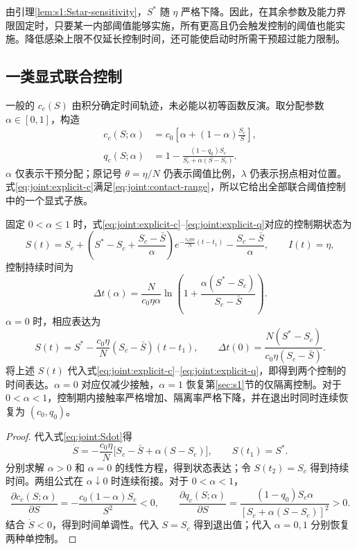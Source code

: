 \documentclass[lang=cn,a4paper,newtx]{elegantpaper}
\numberwithin{equation}{section}
\theoremstyle{plain}
\begin{document}
由引理\ref{lem:s1:Sstar-sensitivity}，$S^*$ 随 $\eta$ 严格下降。因此，在其余参数及能力界限固定时，只要某一内部阈值能够实施，所有更高且仍会触发控制的阈值也能实施。降低感染上限不仅延长控制时间，还可能使启动时所需干预超过能力限制。

\subsection{一类显式联合控制}
一般的 $c_c(S)$ 由积分确定时间轨迹，未必能以初等函数反演。取分配参数 $\alpha\in[0,1]$，构造
\begin{align}
c_c(S;\alpha)&=c_0\left[\alpha+(1-\alpha)\frac{S_c}{S}\right],\label{eq:joint:explicit-c}\\
q_c(S;\alpha)&=1-\frac{(1-q_0)S_c}{S_c+\alpha(S-S_c)}.
\label{eq:joint:explicit-q}
\end{align}
$\alpha$ 仅表示干预分配；原记号 $\theta=\eta/N$ 仍表示阈值比例，$\lambda$ 仍表示拐点相对位置。式\eqref{eq:joint:explicit-c}满足\eqref{eq:joint:contact-range}，所以它给出全部联合阈值控制中的一个显式子族。
\begin{theorem}
\label{thm:joint:explicit}
固定 $0<\alpha\le1$ 时，式\eqref{eq:joint:explicit-c}--\eqref{eq:joint:explicit-q}对应的控制期状态为
\begin{equation}
S(t)=S_c+
\left(S^*-S_c+\frac{S_c-\bar S}{\alpha}\right)
 e^{-\frac{c_0\eta\alpha}{N}(t-t_1)}
-\frac{S_c-\bar S}{\alpha},\qquad I(t)=\eta,
\label{eq:joint:explicit-S}
\end{equation}
控制持续时间为
\begin{equation}
\Delta t(\alpha)=\frac{N}{c_0\eta\alpha}
\ln\!\left(1+\frac{\alpha(S^*-S_c)}{S_c-\bar S}\right).
\label{eq:joint:explicit-duration}
\end{equation}
$\alpha=0$ 时，相应表达为
\begin{equation}
S(t)=S^*-\frac{c_0\eta}{N}(S_c-\bar S)(t-t_1),\qquad
\Delta t(0)=\frac{N(S^*-S_c)}{c_0\eta(S_c-\bar S)}.
\label{eq:joint:explicit-zero}
\end{equation}
将上述 $S(t)$ 代入式\eqref{eq:joint:explicit-c}--\eqref{eq:joint:explicit-q}，即得到两个控制的时间表达。$\alpha=0$ 对应仅减少接触，$\alpha=1$ 恢复第\ref{sec:s1}节的仅隔离控制。对于 $0<\alpha<1$，控制期内接触率严格增加、隔离率严格下降，并在退出时同时连续恢复为 $(c_0,q_0)$。
\end{theorem}
\begin{proof}
代入式\eqref{eq:joint:Sdot}得
\[
\dot S=-\frac{c_0\eta}{N}\bigl[S_c-\bar S+\alpha(S-S_c)\bigr],
\qquad S(t_1)=S^*.
\]
分别求解 $\alpha>0$ 和 $\alpha=0$ 的线性方程，得到状态表达；令 $S(t_2)=S_c$ 得到持续时间。两组公式在 $\alpha\downarrow0$ 时连续衔接。对于 $0<\alpha<1$，
\[
\frac{\partial c_c(S;\alpha)}{\partial S}
=-\frac{c_0(1-\alpha)S_c}{S^2}<0,\qquad
\frac{\partial q_c(S;\alpha)}{\partial S}
=\frac{(1-q_0)S_c\alpha}{[S_c+\alpha(S-S_c)]^2}>0.
\]
结合 $\dot S<0$，得到时间单调性。代入 $S=S_c$ 得到退出值；代入 $\alpha=0,1$ 分别恢复两种单控制。
\end{proof}
\end{document}
